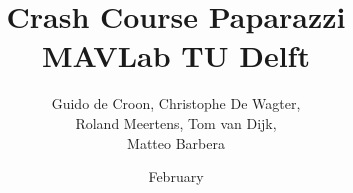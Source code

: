 \documentclass{report}
\begin{document}
\author{Guido de Croon, Christophe De Wagter, \\Roland Meertens, Tom van Dijk, \\Matteo Barbera}
\title{\bf Crash Course Paparazzi \the\year\\MAVLab TU Delft}
\date{February \the\year}
\maketitle

\tableofcontents

\setlength{\parindent}{0em}





	
\end{document}
